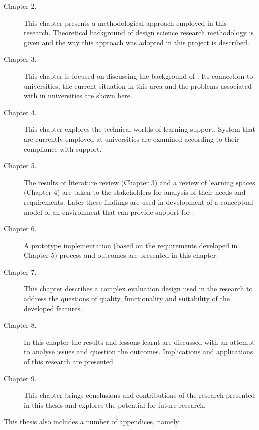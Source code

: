 \begin{description}
\item[Chapter 2.] This chapter presents a methodological approach employed in
this research. Theoretical background of design science research methodology is
given and the way this approach was adopted in this project is described.
\item[Chapter 3.] This chapter is focused on discussing the background of
\LLLsn. Its connection to universities, the current situation in this area and
the problems associated with \LLLs in universities are shown here.
\item[Chapter 4.] This chapter explores the technical worlds of learning
support. System that are currently employed at universities are examined according
to their compliance with \LLLs support.
\item[Chapter 5.] The results of literature review (Chapter 3) and a review of
learning spaces (Chapter 4) are taken to the stakeholders for analysis of their
needs and requirements. Later these findings are used in development of a
conceptual model of an environment that can provide support for \LLLsn.
\item[Chapter 6.] A prototype implementation (based on the requirements
developed in Chapter 5) process and outcomes are presented in this chapter.
\item[Chapter 7.] This chapter describes a complex evaluation design used in the
research to address the questions of quality, functionality and suitability of
the developed features.
\item[Chapter 8.] In this chapter the results and lessons learnt are discussed
with an attempt to analyse issues and question the outcomes. Implications and
applications of this research are presented.
\item[Chapter 9.] This chapter brings conclusions and contributions of the
research presented in this thesis and explores the potential for future research.
\end{description}

This thesis also includes a number of appendices, namely:

